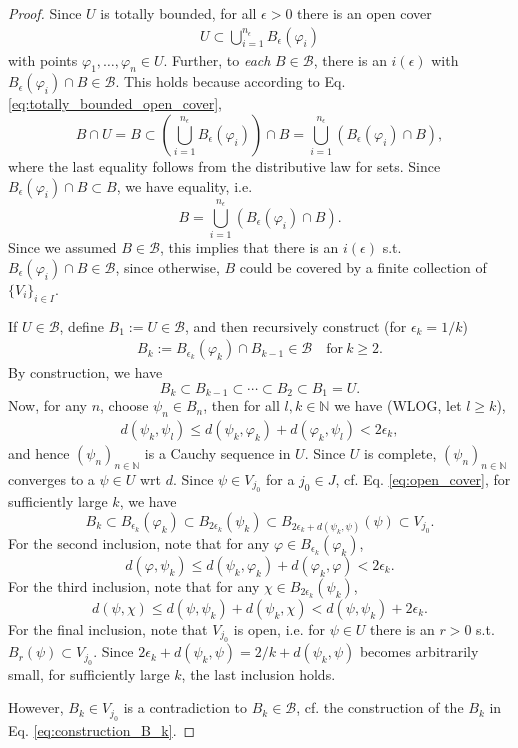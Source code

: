 \documentclass[12pt, a4paper]{article}
\numberwithin{equation}{section}
\theoremstyle{definition}
\theoremstyle{definition}
\newcommand{\seq}[1][\varphi]{\left( #1 \right)_{n \in \mathbb{N}}}
\begin{document}
\begin{proof}
		Since $U$ is totally bounded, for all $\epsilon > 0$ there is an open cover
		\begin{align}\label{eq:totally_bounded_open_cover}
			U\subset \bigcup_{i=1}^{n_{\epsilon}}B_{\epsilon}(\varphi_i)
		\end{align}
		with points $\varphi_1, \dots, \varphi_n\in U$. Further, to \textit{each} $B\in\mathcal B$, there is an $i(\epsilon)$ with $B_{\epsilon}(\varphi_i)\cap B\in\mathcal B$. This holds because according to Eq. \eqref{eq:totally_bounded_open_cover}, $$B\cap U = B \subset \left(\bigcup_{i=1}^{n_{\epsilon}}B_{\epsilon}(\varphi_i)\right) \cap B = \bigcup_{i=1}^{n_{\epsilon}}\left(B_{\epsilon}(\varphi_i) \cap B\right),$$ where the last equality follows from the distributive law for sets. Since $B_{\epsilon}(\varphi_i) \cap B \subset B$, we have equality, i.e. $$B = \bigcup_{i=1}^{n_{\epsilon}}\left(B_{\epsilon}(\varphi_i) \cap B\right).$$ Since we assumed $B\in\mathcal B$, this implies that there is an $i(\epsilon)$ s.t. $B_{\epsilon}(\varphi_i)\cap B\in \mathcal B$, since otherwise, $B$ could be covered by a finite collection of $\{V_i\}_{i\in I}$.
		
		If $U\in\mathcal B$, define $B_1 := U\in\mathcal B$, and then recursively construct (for $\epsilon_k = 1/k$)
		\begin{align}\label{eq:construction_B_k}
			B_k := B_{\epsilon_k}(\varphi_k) \cap B_{k - 1}\in\mathcal B\quad\text{for}\ k\geq 2.
		\end{align}
		By construction, we have
		$$B_{k} \subset B_{k - 1}\subset \cdots\subset B_2\subset B_1 = U.$$
		Now, for any $n$, choose $\psi_n\in B_n$, then for all $l, k\in\mathbb N$ we have (WLOG, let $l\geq k$),
		\begin{align}
			d(\psi_k, \psi_l) \leq d(\psi_k, \varphi_k) + d(\varphi_k, \psi_l) < 2\epsilon_k,
		\end{align}
		and hence $\seq[\psi_n]$ is a Cauchy sequence in $U$. Since $U$ is complete, $\seq[\psi_n]$ converges to a $\psi\in U$ wrt $d$. Since $\psi\in V_{j_0}$ for a $j_{0}\in J$, cf. Eq. \eqref{eq:open_cover}, for sufficiently large $k$, we have
		$$B_k\subset B_{\epsilon_k}(\varphi_k) \subset B_{2\epsilon_k}(\psi_k) \subset B_{2\epsilon_k + d(\psi_k, \psi)}(\psi) \subset V_{j_0}.$$
		For the second inclusion, note that for any $\varphi\in B_{\epsilon_k}(\varphi_k)$, $$d(\varphi, \psi_k) \leq d(\psi_k, \varphi_k) + d(\varphi_k, \varphi) < 2\epsilon_k.$$
		For the third inclusion, note that for any $\chi\in B_{2\epsilon_k}(\psi_k)$, $$d(\psi, \chi) \leq d(\psi, \psi_k) + d(\psi_k, \chi) < d(\psi, \psi_k) + 2\epsilon_k.$$
		For the final inclusion, note that $V_{j_0}$ is open, i.e. for $\psi\in U$ there is an $r > 0$ s.t. $B_{r}(\psi) \subset V_{j_0}$. Since $2\epsilon_k + d(\psi_k, \psi) = 2/k + d(\psi_k, \psi)$ becomes arbitrarily small, for sufficiently large $k$, the last inclusion holds.
		
		However, $B_k\in V_{j_0}$ is a contradiction to $B_k\in\mathcal B$, cf. the construction of the $B_k$ in Eq. \eqref{eq:construction_B_k}.	
	\end{proof}
	
\end{document}
